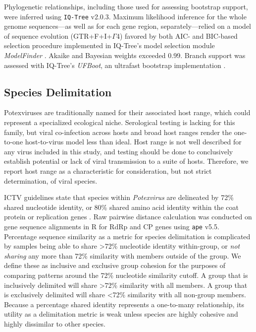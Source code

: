 \documentclass[fleqn,10pt,lineno]{wlpeerj}
\begin{document}
Phylogenetic relationships, including those used for assessing bootstrap support, were inferred using \texttt{IQ-Tree} v2.0.3. 
Maximum likelihood inference for the whole genome sequences---as well as for each gene region, separately---relied on a model of sequence evolution (GTR+F+I+$\Gamma$4) favored by both AIC- and BIC-based selection procedure implemented in IQ-Tree's model selection module {\em ModelFinder} \citep{kalyaanamoorthy2017}. 
Akaike and Bayesian weights exceeded 0.99. 
Branch support was assessed with IQ-Tree's {\em UFBoot}, an ultrafast bootstrap implementation \citep{hoang2018}.


\subsection*{Species Delimitation}
Potexviruses are traditionally named for their associated host range, which could represent a specialized ecological niche.
Serological testing is lacking for this family, but viral co-infection across hosts and broad host ranges render the one-to-one host-to-virus model less than ideal.
Host range is not well described for any virus included in this study, and testing should be done to conclusively establish potential or lack of viral transmission to a suite of hosts.
Therefore, we report host range as a characteristic for consideration, but not strict determination, of viral species. 



ICTV guidelines state that species within \textit{Potexvirus} are delineated by 72\% shared nucleotide identity, or 80\% shared amino acid identity within the coat protein or replication genes \citep{adams2004virology}.
Raw pairwise distance calculation was conducted on gene sequence alignments in R for RdRp and CP genes using \texttt{ape} v5.5. 
Percentage sequence similarity as a metric for species delimitation is complicated by samples being able to share >72\% nucleotide identity within-group, or \textit{not sharing} any more than 72\% similarity with members outside of the group. 
We define these as inclusive and exclusive group cohesion for the purposes of comparing patterns around the 72\% nucleotide similarity cutoff.
A group that is inclusively delimited will share >72\% similarity with all members.
A group that is exclusively delimited will share <72\% similarity with all non-group members.
Because a percentage shared identity represents a one-to-many relationship, its utility as a delimitation metric is weak unless species are highly cohesive and highly dissimilar to other species.
\end{document}
